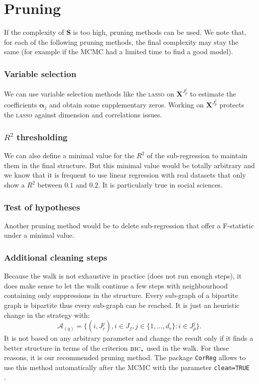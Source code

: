 \documentclass[12pt,a4paper]{report}
\begin{document}
	\section{Pruning}
		If the complexity of $\boldsymbol{S}$ is too high, pruning methods can be used. We note that, for each of the following pruning methods, the final complexity may stay the same (for example if the MCMC had a limited time to find a good model).
		\subsubsection{Variable selection}
			We can use variable selection methods like the \textsc{lasso} on $\boldsymbol{X}^{J_p^j}$ to estimate the coefficients $\boldsymbol{\alpha}_j$ and obtain some supplementary zeros. Working on $\boldsymbol{X}^{J_p^j}$ protects the \textsc{lasso} against dimension and correlations issues.
		\subsubsection{$R^2$ thresholding }
			We can also define a minimal value for the $R^2$ of the sub-regression to maintain them in the final structure. But this minimal value would be totally arbitrary and we know that it is frequent to use linear regression with real datasets that only show a $R^2$ between $0.1$ and $0.2$. It is particularly true in social sciences.
		\subsubsection{Test of hypotheses}
			Another pruning method would be to delete sub-regression that offer a F-statistic under a minimal value.
		\subsubsection{Additional cleaning steps}
			Because the walk is not exhaustive in practice (does not run enough steps), it does make sense to let the walk continue a few steps with neighbourhood containing only suppressions in the structure. Every sub-graph of a bipartite graph is bipartite thus every sub-graph can be reached. It is just an heuristic change in the strategy with:
			\begin{equation}
				\mathcal{A}_{(q)}=\{(i,J_r^j), i \in J_f, j \in \{1,\dots,d_r \}: i \in J_p^j \}. \nonumber 
			\end{equation}
			It is not based on any arbitrary parameter and change the result only if it finds a better structure in terms of the criterion $\mbox{{\sc bic}}_*$ used in the walk.
			For these reasons, it is our recommended pruning method. The package {\tt CorReg} allows to use this method automatically after the MCMC with the parameter {\tt clean=TRUE }.
			
\end{document}
